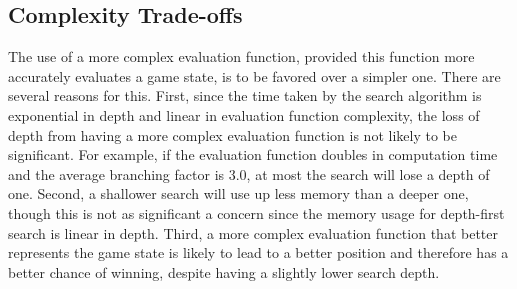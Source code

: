 \documentclass[journal,hidelinks]{IEEEtran}
\begin{document}
\begin{table}[!htb]
	\centering
	\caption{Central Dominance Lookup Table.}
	\label{tab:central-dominance}
\end{table}

\subsection{Complexity Trade-offs}

The use of a more complex evaluation function, provided this function more accurately evaluates a game state, is to be favored over a simpler one. There are several reasons for this. First, since the time taken by the search algorithm is exponential in depth and linear in evaluation function complexity, the loss of depth from having a more complex evaluation function is not likely to be significant. For example, if the evaluation function doubles in computation time and the average branching factor is $3.0$, at most the search will lose a depth of one. Second, a shallower search will use up less memory than a deeper one, though this is not as significant a concern since the memory usage for depth-first search is linear in depth. Third, a more complex evaluation function that better represents the game state is likely to lead to a better position and therefore has a better chance of winning, despite having a slightly lower search depth.
\end{document}
